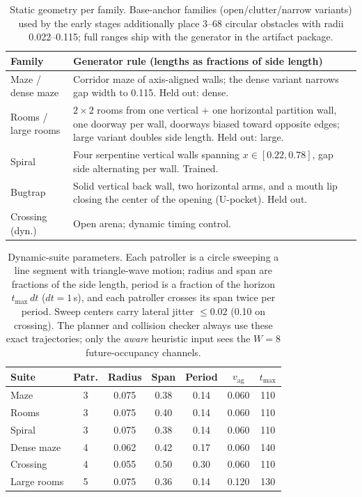 \documentclass[letterpaper]{article} %
\begin{document}
\begin{table}[t]
\centering
\small
\setlength{\tabcolsep}{2.5pt}
\begin{tabular}{@{}lp{5.6cm}@{}}
\toprule
Family & Generator rule (lengths as fractions of side length) \\
\midrule
Maze / dense maze & Corridor maze of axis-aligned walls; the dense variant narrows gap width to 0.115. Held out: dense. \\
Rooms / large rooms & $2{\times}2$ rooms from one vertical + one horizontal partition wall, one doorway per wall, doorways biased toward opposite edges; large variant doubles side length. Held out: large. \\
Spiral & Four serpentine vertical walls spanning $x \in [0.22, 0.78]$, gap side alternating per wall. Trained. \\
Bugtrap & Solid vertical back wall, two horizontal arms, and a mouth lip closing the center of the opening (U-pocket). Held out. \\
Crossing (dyn.) & Open arena; dynamic timing control. \\
\bottomrule
\end{tabular}
\caption{Static geometry per family. Base-anchor families (open/clutter/narrow variants) used by the early stages additionally place 3--68 circular obstacles with radii 0.022--0.115; full ranges ship with the generator in the artifact package.}
\label{tab:envspec}
\end{table}

\begin{table}[t]
\centering
\small
\setlength{\tabcolsep}{2.5pt}
\begin{tabular}{@{}lcccccc@{}}
\toprule
Suite & Patr. & Radius & Span & Period & $v_{\mathrm{ag}}$ & $t_{\max}$ \\
\midrule
Maze & 3 & 0.075 & 0.38 & 0.14 & 0.060 & 110 \\
Rooms & 3 & 0.075 & 0.40 & 0.14 & 0.060 & 110 \\
Spiral & 3 & 0.075 & 0.38 & 0.14 & 0.060 & 110 \\
Dense maze & 4 & 0.062 & 0.42 & 0.17 & 0.060 & 140 \\
Crossing & 4 & 0.055 & 0.50 & 0.30 & 0.060 & 110 \\
Large rooms & 5 & 0.075 & 0.36 & 0.14 & 0.120 & 130 \\
\bottomrule
\end{tabular}
\caption{Dynamic-suite parameters. Each patroller is a circle sweeping a line segment with triangle-wave motion; radius and span are fractions of the side length, period is a fraction of the horizon $t_{\max}\,dt$ ($dt{=}1$\,s), and each patroller crosses its span twice per period. Sweep centers carry lateral jitter $\leq 0.02$ (0.10 on crossing). The planner and collision checker always use these exact trajectories; only the \emph{aware} heuristic input sees the $W{=}8$ future-occupancy channels.}
\label{tab:dynspec}
\end{table}
\end{document}
